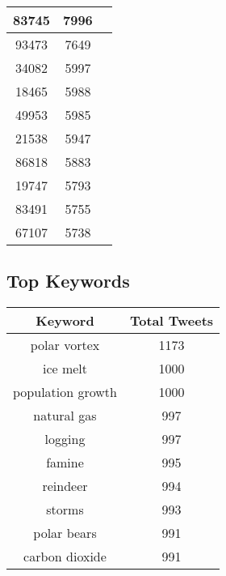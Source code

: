 \documentclass{article}\usepackage[T1]{fontenc}
\begin{document}
\begin{tabular}{|c|c|c|}
 \hline
83745 & 7996\\ 
 \hline
93473 & 7649\\ 
 \hline
34082 & 5997\\ 
 \hline
18465 & 5988\\ 
 \hline
49953 & 5985\\ 
 \hline
21538 & 5947\\ 
 \hline
86818 & 5883\\ 
 \hline
19747 & 5793\\ 
 \hline
83491 & 5755\\ 
 \hline
67107 & 5738\\ 
 \hline
\end{tabular}\subsection*{Top Keywords}\begin{tabular}{|c|c|}         \hline         Keyword & Total Tweets \\ 
 \hline
polar vortex & 1173\\ 
 \hline
ice melt & 1000\\ 
 \hline
population growth & 1000\\ 
 \hline
natural gas & 997\\ 
 \hline
logging & 997\\ 
 \hline
famine & 995\\ 
 \hline
reindeer & 994\\ 
 \hline
storms & 993\\ 
 \hline
polar bears & 991\\ 
 \hline
carbon dioxide & 991\\ 
 \hline
\end{tabular}
\end{document}
